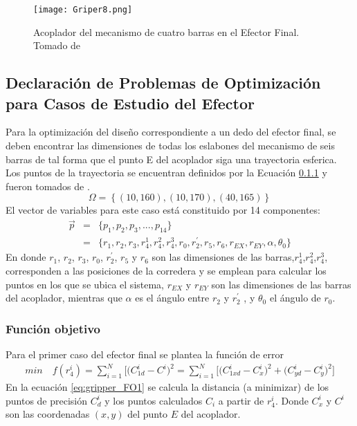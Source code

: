 \begin{figure}[htb]
    \centering
     \texttt{[image: Griper8.png]}
    \caption[Acoplador del mecanismo de cuatro barras en el Efector Final]{Acoplador del mecanismo de cuatro barras en el Efector Final. Tomado de \cite{zapata_zapata_control_2017} }
    \label{fig:Griper_MEC1}
\end{figure}
\subsection{Declaración de Problemas de Optimización para Casos de Estudio del Efector}
Para la optimización del diseño correspondiente a un dedo del efector final, se deben encontrar las dimensiones de todas los eslabones del mecanismo de seis barras de tal forma que el punto E del acoplador siga una trayectoria esferica. Los puntos de la trayectoria se encuentran definidos por la Ecuación \ref{} y fueron tomados de \cite{capistran_2015}.
\begin{equation} \label{eq:griper_puntosP}
 \Omega= \left\{(10, 160), (10, 170), (40, 165) \right\}
\end{equation}
El vector de variables para este caso está constituido por 14 componentes:
\begin{eqnarray}\label{eq:Vector variables MEC1}
\vec{p} &=& \{p_1,p_2,p_3,...,p_{14} \}\\
       &=& \{ r_1,r_2,r_3,r^1_4,r^2_4,r^3_4,r_0,r^{\prime}_2,r_5,r_6,r_{EX},r_{EY},\alpha,\theta_0 \} 
\end{eqnarray}
En donde $r_1$, $r_2$, $r_3$, $r_0$, $r^{\prime}_2$, $r_5$ y $r_6$ son las dimensiones de las barras,$r^1_4$,$r^2_4$,$r^3_4$, corresponden a las posiciones de la corredera y se emplean para calcular los puntos en los que se ubica el sistema, $r_{EX}$ y $r_{EY}$ son las dimensiones de las barras del acoplador, mientras que  $\alpha$ es el ángulo entre $r_2$ y $r^{\prime}_2$ , y $\theta_0$ el ángulo de $r_0$.
\subsubsection{Función objetivo}
Para el primer caso del efector final  se plantea la función de error 
\begin{equation}\label{eq:gripper_FO1}
 \begin{aligned}
min\quad  f(r^i_4)=\sum_{i=1}^{N}\big[\big(C^{i}_{1d}-C^{i} \big)^2=
\sum_{i=1}^{N}\big[\big(C^{i}_{1xd}-C^{i}_{x} \big)^2 +\big(C^{i}_{yd}-C^{i}_{y} \big)^2\big] 
\end{aligned}
\end{equation}
En la ecuación \ref{eq:gripper_FO1} se calcula la distancia (a minimizar) de los puntos de precisión $C^i_d$ y los puntos calculados $C_i$ a partir de $r^i_4$. Donde  $C^i_x$ y $C^i$ son las coordenadas $(x,y)$ del punto $E$ del acoplador.
